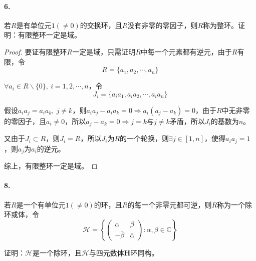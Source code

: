 \documentclass[12pt, a4paper, oneside]{ctexart}
\begin{document}
\paragraph{6.}若$R$是有单位元$1(\neq 0)$的交换环，且$R$没有非零的零因子，则$R$称为整环。证明：有限整环一定是域。
\begin{proof}
    要证有限整环$R$一定是域，只需证明$R$中每一个元素都有逆元，由于$R$有限，令
    \begin{equation*}
        R = \{a_1,a_2,\cdots, a_n\}
    \end{equation*}

    $\forall a_i\in R\backslash\{0\},\ i=1,2,\cdots,n$，令
    \begin{equation*}
        J_i = \{a_ia_1,a_ia_2,\cdots,a_ia_n\}
    \end{equation*}

    假设$a_ia_j=a_ia_k,\ j\neq k$，则$a_ia_j-a_ia_k=0\Rightarrow a_i(a_j-a_k)=0$，由于$R$中无非零的零因子，且$a_i\neq 0$，所以$a_j-a_k=0\Rightarrow j = k$与$j\neq k$矛盾，所以$J_i$的基数为$n$。
    
    又由于$J_i\subset R$，则$J_i = R$，所以$J_i$为$R$的一个轮换，则$\exists j\in [1,n]$，使得$a_ia_j = 1$，则$a_j$为$a_i$的逆元。

    综上，有限整环一定是域。
\end{proof}
\paragraph{8.}若$R$是一个有单位元$1(\neq 0)$的环，且$R$的每一个非零元都可逆，则$R$称为一个除环或体，令
\begin{equation*}
    \mathcal{H} = \left\{\begin{pmatrix}
        \alpha&\beta\\-\bar{\beta}&\bar{\alpha}
    \end{pmatrix}
    :\alpha,\beta\in\mathbb{C}\right\}
\end{equation*}

证明：$\mathcal{H}$是一个除环，且$\mathcal{H}$与四元数体$\mathbf{H}$环同构。
\end{document}

